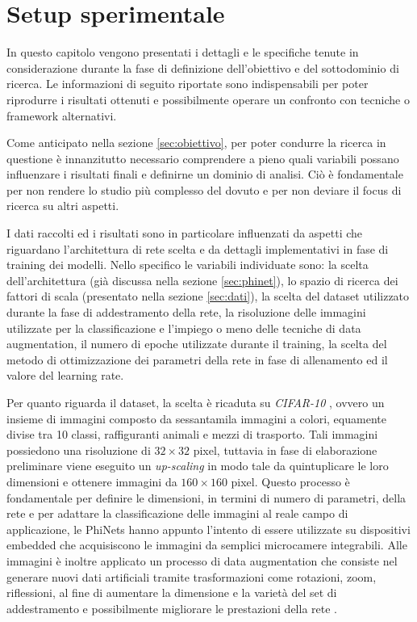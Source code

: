 \newpage
\chapter{Setup sperimentale}
\label{cha:setup}

In questo capitolo vengono presentati i dettagli e le specifiche tenute in considerazione durante la fase di definizione dell'obiettivo e del sottodominio di ricerca. Le informazioni di seguito riportate sono indispensabili per poter riprodurre i risultati ottenuti e possibilmente operare un confronto con tecniche o framework alternativi.


Come anticipato nella sezione \ref{sec:obiettivo}, per poter condurre la ricerca in questione è innanzitutto necessario comprendere a pieno quali variabili possano influenzare i risultati finali e definirne un dominio di analisi. Ciò è fondamentale per non rendere lo studio più complesso del dovuto e per non deviare il focus di ricerca su altri aspetti. 

I dati raccolti ed i risultati sono in particolare influenzati da aspetti che riguardano l'architettura di rete scelta e da dettagli implementativi in fase di training dei modelli. Nello specifico le variabili individuate sono: la scelta dell'architettura (già discussa nella sezione \ref{sec:phinet}), lo spazio di ricerca dei fattori di scala (presentato nella sezione \ref{sec:dati}), la scelta del dataset utilizzato durante la fase di addestramento della rete, la risoluzione delle immagini utilizzate per la classificazione e l'impiego o meno delle tecniche di data augmentation, il numero di epoche utilizzate durante il training, la scelta del metodo di ottimizzazione dei parametri della rete in fase di allenamento ed il valore del learning rate.

Per quanto riguarda il dataset, la scelta è ricaduta su \textit{CIFAR-10} \cite{datasets}, ovvero un insieme di immagini composto da sessantamila immagini a colori, equamente divise tra 10 classi, raffiguranti animali e mezzi di trasporto. Tali immagini possiedono una risoluzione di $32 \times 32$ pixel, tuttavia in fase di elaborazione preliminare viene eseguito un \textit{up-scaling} in modo tale da quintuplicare le loro dimensioni e ottenere immagini da $160 \times 160$ pixel. Questo processo è fondamentale per definire le dimensioni, in termini di numero di parametri, della rete e per adattare la classificazione delle immagini al reale campo di applicazione, le PhiNets hanno appunto l'intento di essere utilizzate su dispositivi embedded che acquisiscono le immagini da semplici microcamere integrabili. Alle immagini è inoltre applicato un processo di data augmentation \cite{timm} che consiste nel generare nuovi dati artificiali tramite trasformazioni come rotazioni, zoom, riflessioni, al fine di aumentare la dimensione e la varietà del set di addestramento e possibilmente migliorare le prestazioni della rete \cite{augdata}.

